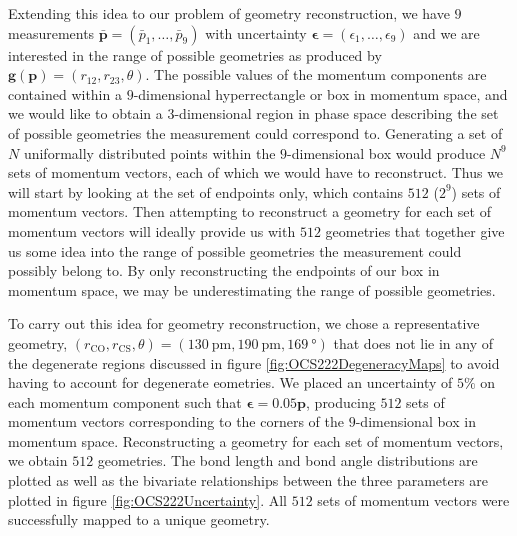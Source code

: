 Extending this idea to our problem of geometry reconstruction, we have $9$ measurements $\bar{\mathbf{p}} = (\bar{p}_1, \dots, \bar{p}_9)$ with uncertainty $\bm{\epsilon} = (\epsilon_1, \dots, \epsilon_9)$ and we are interested in the range of possible geometries as produced by $\mathbf{g}(\mathbf{p}) = (r_{12}, r_{23}, \theta)$. The possible values of the momentum components are contained within a $9$-dimensional hyperrectangle or box in momentum space, and we would like to obtain a $3$-dimensional region in phase space describing the set of possible geometries the measurement could correspond to. Generating a set of $N$ uniformally distributed points within the $9$-dimensional box would produce $N^9$ sets of momentum vectors, each of which we would have to reconstruct. Thus we will start by looking at the set of endpoints only, which contains $512$ ($2^9$) sets of momentum vectors. Then attempting to reconstruct a geometry for each set of momentum vectors will ideally provide us with $512$ geometries that together give us some idea into the range of possible geometries the measurement could possibly belong to. By only reconstructing the endpoints of our box in momentum space, we may be underestimating the range of possible geometries.

To carry out this idea for geometry reconstruction, we chose a representative geometry, $(r_\mathrm{CO}, r_\mathrm{CS}, \theta) = (\SI{130}{\pico\m}, \SI{190}{\pico\m}, \SI{169}{\degree})$ that does not lie in any of the degenerate regions discussed in figure \ref{fig:OCS222DegeneracyMaps} to avoid having to account for degenerate eometries. We placed an uncertainty of $5\%$ on each momentum component such that $\bm{\epsilon} = 0.05\mathbf{p}$, producing $512$ sets of momentum vectors corresponding to the corners of the $9$-dimensional box in momentum space. Reconstructing a geometry for each set of momentum vectors, we obtain $512$ geometries. The bond length and bond angle distributions are plotted as well as the bivariate relationships between the three parameters are plotted in figure \ref{fig:OCS222Uncertainty}. All $512$ sets of momentum vectors were successfully mapped to a unique geometry.

